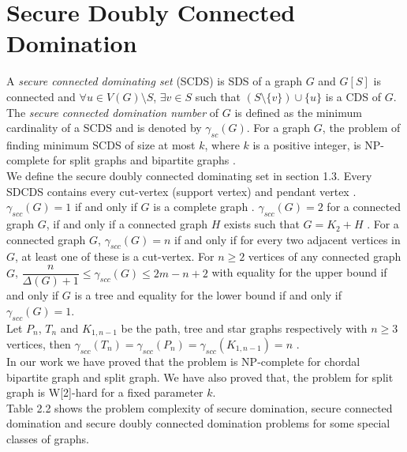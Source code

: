 \section{Secure Doubly Connected Domination}
\noindent
A \textit{secure connected dominating set} (SCDS) is SDS of a graph $G$ and $G[S]$ is connected and $\forall u \in V(G) \setminus S$, $\exists v \in S$ such that $(S \setminus \{v \}) \cup \{ u \}$ is a CDS of $G$. The \textit{secure connected domination number} of $G$ is defined as the minimum cardinality of a SCDS and is denoted by $\gamma_{sc}(G)$. For a graph $G$, the problem of finding minimum SCDS of size at most $k$, where $k$ is a positive integer, is NP-complete for split graphs and bipartite graphs \cite{pvsr}.\\
We define the secure doubly connected dominating set in section 1.3. Every SDCDS contains every cut-vertex (support vertex) and pendant vertex \cite{sdcds}. $\gamma_{scc}(G)=1$ if and only if $G$ is a complete graph \cite{sdcds}. $\gamma_{scc}(G)=2$ for a connected graph $G$, if and only if a connected graph $H$ exists such that $G=K_2+H$ \cite{sdcds}. For a connected graph $G$, $\gamma_{scc}(G)=n$ if and only if for every two adjacent vertices in $G$, at least one of these is a cut-vertex. For $n \geq 2$ vertices of any connected graph $G$, $\dfrac{n}{\Delta(G)+1} \leq \gamma_{scc}(G) \leq 2m-n+2 $ with equality for the upper bound if and only if $G$ is a tree and equality for the lower bound if and only if $\gamma_{scc}(G) = 1$.\\
Let $P_n$, $T_n$ and $K_{1,n-1}$ be the path, tree and star graphs respectively with $n \geq 3$ vertices, then $\gamma_{scc}(T_n)=\gamma_{scc}(P_n)=\gamma_{scc}(K_{1,n-1})=n$ \cite{sdcds}.\\
\noindent
In our work we have proved that the problem is NP-complete for chordal bipartite graph and split graph. We have also proved that, the problem for split graph is W[2]-hard for a fixed parameter $k$.\\
\noindent
Table 2.2 shows the problem complexity of secure domination, secure connected domination and secure doubly connected domination problems for some special classes of graphs.
